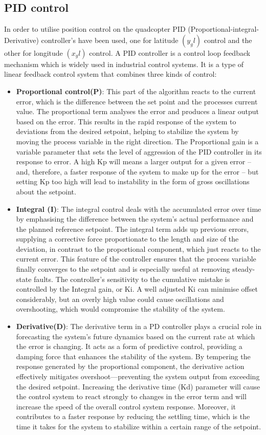 \documentclass{report}
\begin{document}
\subsection{PID control}\label{PID_control} In order to utilise position
control on the quadcopter PID (Proportional-integral-Derivative) controller's
have been used, one for latitude \((y_gl)\) control and the other for longitude \((x_gl)\) control. A
PID controller is a control loop feedback mechanism which is widely used in
industrial control systems. It is a type of linear feedback control system that
combines three kinds of control:
\begin{itemize}
  \item \textbf{Proportional control(P)}: This part of the algorithm reacts to
  the current error, which is the difference between the set point and the
  processes current value. The proportional term analyses the error and produces
  a linear output based on the error. This results in the rapid response of the
  system to deviations from the desired setpoint, helping to stabilize the
  system by moving the process variable in the right direction. The Proportional
  gain is a variable parameter that sets the level of aggression of the PID
  controller in its response to error. A high Kp will means a larger output for
  a given error – and, therefore, a faster response of the system to make up for
  the error – but setting Kp too high will lead to instability in the form of
  gross oscillations about the setpoint.
  \item \textbf{Integral (I)}: The integral control deals with the accumulated
  error over time by emphasising the difference between the system's actual
  performance and the planned reference setpoint. The integral term adds up
  previous errors, supplying a corrective force proportionate to the length and
  size of the deviation, in contrast to the proportional component, which just
  reacts to the current error. This feature of the controller ensures that the
  process variable finally converges to the setpoint and is especially useful at
  removing steady-state faults. The controller's sensitivity to the cumulative
  mistake is controlled by the Integral gain, or Ki. A well adjusted Ki can
  minimise offset considerably, but an overly high value could cause
  oscillations and overshooting, which would compromise the stability of the
  system.
  \item \textbf{Derivative(D)}: The derivative term in a PD controller plays a
  crucial role in forecasting the system's future dynamics based on the current
  rate at which the error is changing. It acts as a form of predictive control,
  providing a damping force that enhances the stability of the system. By
  tempering the response generated by the proportional component, the derivative
  action effectively mitigates overshoot—preventing the system output from
  exceeding the desired setpoint. Increasing the derivative time (Kd) parameter
  will cause the control system to react strongly to changes in the error term
  and will increase the speed of the overall control system response. Moreover,
  it contributes to a faster response by reducing the settling time, which is
  the time it takes for the system to stabilize within a certain range of the
  setpoint.
\end{itemize}
\end{document}

